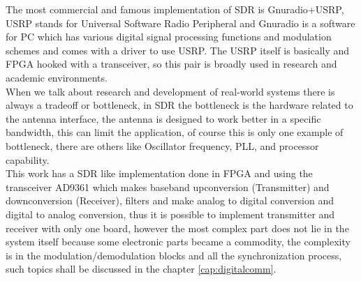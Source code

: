 The most commercial and famous implementation of SDR is Gnuradio+USRP, USRP
stands for Universal Software Radio Peripheral \cite{web:usrp} and Gnuradio \cite{web:gnuradio}
is a software for PC which has various digital signal processing functions and
modulation schemes and comes with a driver to use USRP. The USRP itself is
basically and FPGA hooked with a transceiver, so this pair is broadly used in
research and academic environments.\\

When we talk about research and development of real-world systems there is always
a tradeoff or bottleneck, in SDR the bottleneck is the hardware related to the
antenna interface, the antenna is designed to work better in a specific bandwidth,
this can limit the application, of course this is only one example of bottleneck,
there are others like Oscillator frequency, PLL, and processor capability.\\


This work has a SDR like implementation done in FPGA and using the transceiver
AD9361 which makes baseband upconversion (Transmitter) and downconversion (Receiver),
filters and make analog to digital conversion and digital to analog conversion,
thus it is possible to implement transmitter and receiver with only one board,
however the most complex part does not lie in the system itself because some electronic
parts became a commodity, the complexity is in the modulation/demodulation blocks
and all the synchronization process, such topics shall be discussed in the chapter \ref{cap:digitalcomm}.
